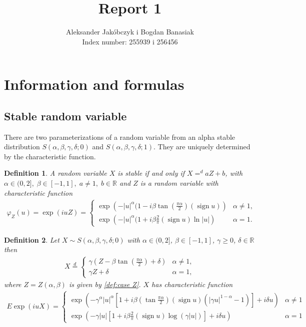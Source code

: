 \documentclass{article}
\title{Report 1}
\author{Aleksander Jakóbczyk i Bogdan Banasiak\\ 
	Index number: 255939 i 256456}
\date{}\date{}
\newtheorem{definition}{Definition}
\DeclareMathOperator{\sign}{sign}
\begin{document}
	
	\maketitle
	\section{Information and formulas}
		\subsection*{Stable random variable}
		There are two parameterizations of a random variable from an alpha stable distribution $S(\alpha, \beta , \gamma, \delta; 0)$ and $S(\alpha, \beta , \gamma, \delta; 1)$.
		They are uniquely determined by the characteristic function.
		\begin{definition} A random variable $X$ is stable if and only if $X=^d aZ +b$, with \\$\alpha \in (0,2],\;\beta\in [-1,1],\; a\ne1,\; b\in\mathbb{R}$ and $Z$ is a random variable with characteristic function  
			\begin{gather*}
				\varphi_Z(u) = \exp(i u Z) =
				\begin{cases}\label{def:case Z}
					\exp\left(- |u|^\alpha(1-i\beta\tan(\frac{\pi\alpha}{2})(\sign u)  \right) &\alpha \ne 1,\\
					\exp\left(- |u|^\alpha(1+i\beta\frac{2}{\pi}(\sign u)\ln|u|  \right) &\alpha = 1.
				\end{cases}
			\end{gather*}
		\end{definition}
		\begin{definition} Let $X \sim S(\alpha, \beta , \gamma, \delta; 0)$ with $\alpha \in (0,2]$, $\beta \in [-1,1]$, $\gamma \ge 0$, $\delta\in\mathbb{R}$ then  
			\begin{gather*}
				X \stackrel{d}{=} 
				\begin{cases}
					\gamma (Z- \beta\tan(\frac{\pi\alpha}{2})+\delta)& \alpha\ne1,\\
					\gamma Z + \delta& \alpha=1,
				\end{cases}
			\end{gather*}
			where $Z = Z(\alpha,\beta)$ is given by \ref{def:case Z}. $X$ has characteristic function
			\begin{gather*}
				E \exp (i u X)= \begin{cases}
					\exp \left(-\gamma^\alpha|u|^\alpha\left[1+i \beta\left(\tan \frac{\pi \alpha}{2}\right)(\operatorname{sign} u)\left(|\gamma u|^{1-\alpha}-1\right)\right]+i \delta u\right) & \alpha \neq 1 \\ \exp \left(-\gamma|u|\left[1+i \beta \frac{2}{\pi}(\operatorname{sign} u) \log (\gamma|u|)\right]+i \delta u\right) & \alpha=1
				\end{cases}
			\end{gather*}
		\end{definition}
\end{document}
